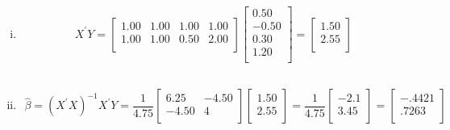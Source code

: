 \documentclass{article}
\begin{document}
\begin{flushleft}
\begin{enumerate}[(i)]
\item
\begin{multline*}\\
X^{'}Y=\left[
\begin{array}{rrrr}
1.00 & 1.00 & 1.00 & 1.00 \\ 
1.00 & 1.00 & 0.50 & 2.00 \\ 
\end{array}
\right]\left[
\begin{array}{r}
0.50 \\ 
-0.50 \\ 
0.30 \\ 
1.20 \\ 
\end{array}
\right]=\left[
\begin{array}{r}
1.50 \\ 
2.55 \\ 
\end{array}
\right]\\
\end{multline*}

\item
\begin{multline*}\\
\hat{\beta}=(X^{'}X)^{-1}X^{'}Y=\dfrac{1}{4.75}\left[\begin{array}{rr}
6.25 & -4.50 \\ 
-4.50 & 4 \\ 
\end{array}\right]\left[
\begin{array}{r}
1.50 \\ 
2.55 \\ 
\end{array}
\right]=\dfrac{1}{4.75}\left[
\begin{array}{r}
-2.1 \\ 
3.45 \\ 
\end{array}\right]=\left[
\begin{array}{r}
-.4421 \\ 
.7263 \\ 
\end{array}\right]\\
\end{multline*}


\end{enumerate}
\end{flushleft}
\end{document}
